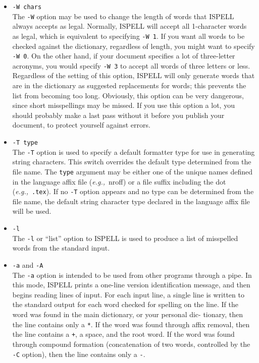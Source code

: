 \documentclass[noabs,nolof,twoside,11pt]{starlink}
\begin{document}
\begin{itemize}
\item {\Large\tt -W chars}\\
The \verb+-W+ option may be used to change the length of words that ISPELL
always accepts as legal.
Normally, ISPELL will accept all 1-character words as legal, which is equivalent
to specifying \verb+-W 1+\@.
If you want all words to be checked against the dictionary, regardless of
length, you might want to specify \verb+-W 0+\@.
On the other hand, if your document specifies a lot of three-letter acronyms,
you would specify \verb+-W 3+ to accept all words of three letters or less.
Regardless of the setting of this option, ISPELL will only generate words that
are in the dictionary as suggested replacements for words; this prevents the
list from becoming too long.  Obviously, this option can be very dangerous,
since short misspellings may be missed.  If you use this option a lot, you
should probably make a last pass without it before you publish your document,
to protect yourself against errors.

\item {\Large\tt -T type}\\
The \verb+-T+ option is used to specify a default formatter type for use in
generating string characters.
This switch overrides the default type determined from the file name.
The \verb+type+ argument may be either one of the unique names defined in the
language affix file ({\it{e.g.,}}\ nroff) or a file suffix including the dot
({\it{e.g.,}}\ \verb+.tex+)\@.  If no \verb+-T+ option appears and no type
can be determined from the file name, the default string character type
declared in the language affix file will be used.

\item {\Large\tt -l}\\
The \verb+-l+ or ``list'' option to ISPELL is used to produce a list of
misspelled words from the standard input.

\item {\Large\tt -a} and {\Large\tt -A}\\
The \verb+-a+ option is intended to be used from other programs through a pipe.
In this mode, ISPELL prints a one-line version identification message, and
then begins reading lines of input.
For each input line, a single line is written to the standard output for each
word checked for spelling on the line.
If the word was found in the main dictionary, or your personal dic-
tionary, then the line contains only a \verb+*+\@.
If the word was found through affix removal, then the line contains a \verb-+-,
a space, and the root word.
If the word was found through compound formation (concatenation of two words,
controlled by the \verb+-C+ option), then the line contains only a \verb+-+\@.


\end{itemize}
\end{document}
